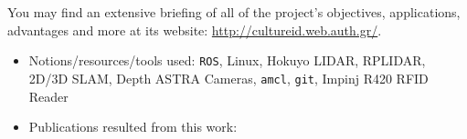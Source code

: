 You may find an extensive briefing of all of the project's objectives,
applications, advantages and more at its website:
\url{http://cultureid.web.auth.gr/}.


\begin{itemize}
  \item Notions/resources/tools used: \texttt{ROS}, Linux, Hokuyo LIDAR, RPLIDAR, 2D/3D SLAM, Depth ASTRA Cameras, \texttt{amcl}, \texttt{git}, Impinj R420 RFID Reader
\item Publications resulted from this work: \cite{8739423,8739486,Filotheou2020a,9109328,9244904,Filotheou2020b,9566425,9617436}
\end{itemize}
